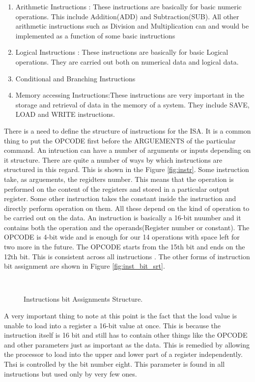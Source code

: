 \begin{enumerate}
\item Arithmetic Instructions : These instructions are basically for basic numeric operations. This include Addition(ADD) and Subtraction(SUB). All other arithmetic instructions such as Division and Multiplication can and would be implemented as a function of some basic instructions
\item Logical Instructions : These instructions are basically for basic Logical operations. They are carried out both on numerical data and logical data. 
\item Conditional and Branching Instructions
\item Memory accessing Instructions:These instructions are very important in the storage and retrieval of data in the memory of a system. They include SAVE, LOAD and WRITE instructions.
\end{enumerate}

There is a need to define the structure of instructions for the ISA. It is a common thing to put the OPCODE first before the ARGUEMENTS of the particular command. An intruction can have a number of arguments or inputs depending on it structure. There are quite a number of ways by which instructions are structured in this regard. This is shown in the Figure \ref{fig:instr}. Some instruction take, as arguements, the regidters number. This means that the operation is performed on the content of the registers and stored in a particular output register. Some other instruction takes the constant inside the instruction and directly perform operation on them. All these depend on the kind of operation to be carried out on the data. 
An instruction is basically a 16-bit nuumber and it contains both the operation and the operands(Register number or constant). The OPCODE is 4-bit wide and is enough for our 14 operations with space left for two more in the future. The OPCODE starts from the 15th bit and ends on the 12th bit. This is consistent across all instructions . The other forms of instruction bit assignment are shown in Figure \ref{fig:inst_bit_srt}. 





\begin{figure}[p]
\\
\caption{Instructions bit Assignments Structure.}
\label{fig:instrset}
\end{figure}
A very important thing to note at this point is the fact that the load value is unable to load into a register a 16-bit value at once. This is because the instruction itself is 16 bit and still has to contain other things like the OPCODE and other parameters just as important as the data. This is remedied by allowing the processor to load into the upper and lower part of a register independently. Thsi is controlled by the bit number eight. This parameter is found in all instructions but used only by very few ones.

